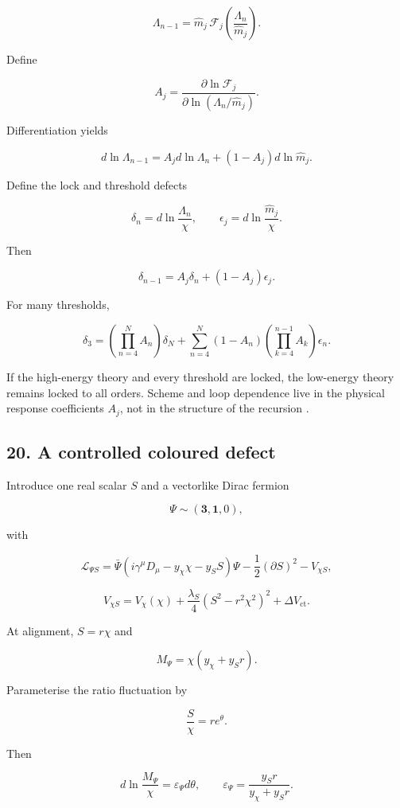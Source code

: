 \documentclass[
]{article}
\begin{document}
\[
\Lambda_{n-1}
=\widehat m_j\,
\mathcal F_j\left(\frac{\Lambda_n}{\widehat m_j}\right).
\]

Define

\[
A_j=\frac{\partial\ln\mathcal F_j}
{\partial\ln(\Lambda_n/\widehat m_j)}.
\]

Differentiation yields

\[
d\ln\Lambda_{n-1}
=A_jd\ln\Lambda_n
+(1-A_j)d\ln\widehat m_j.
\]

Define the lock and threshold defects

\[
\delta_n=d\ln\frac{\Lambda_n}{\chi},
\qquad
\epsilon_j=d\ln\frac{\widehat m_j}{\chi}.
\]

Then

\[
\boxed{
\delta_{n-1}=A_j\delta_n+(1-A_j)\epsilon_j.
}
\]

For many thresholds,

\[
\delta_3
=\left(\prod_{n=4}^{N}A_n\right)\delta_N
+\sum_{n=4}^{N}(1-A_n)
\left(\prod_{k=4}^{n-1}A_k\right)\epsilon_n.
\]

If the high-energy theory and every threshold are locked, the low-energy
theory remains locked to all orders. Scheme and loop dependence live in
the physical response coefficients \(A_j\), not in the structure of the
recursion .

\subsection{20. A controlled coloured
defect}\label{a-controlled-coloured-defect}

Introduce one real scalar \(S\) and a vectorlike Dirac fermion

\[
\Psi\sim(\mathbf3,\mathbf1,0),
\]

with

\[
\mathcal L_{\Psi S}
=\bar\Psi(i\gamma^\mu D_\mu-y_\chi\chi-y_SS)\Psi
-\frac12(\partial S)^2
-V_{\chi S},
\]

\[
V_{\chi S}
=V_\chi(\chi)
+\frac{\lambda_S}{4}(S^2-r^2\chi^2)^2
+\Delta V_{\mathrm{ct}}.
\]

At alignment, \(S=r\chi\) and

\[
M_\Psi=\chi(y_\chi+y_Sr).
\]

Parameterise the ratio fluctuation by

\[
\frac S\chi=re^\theta.
\]

Then

\[
\boxed{
 d\ln\frac{M_\Psi}{\chi}
 =\varepsilon_\Psi d\theta,
\qquad
\varepsilon_\Psi=\frac{y_Sr}{y_\chi+y_Sr}.
}
\]
\end{document}
